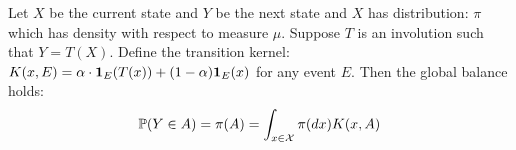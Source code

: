 \documentclass{article}
\begin{document}




\begin{theorem}\label{thm_invariance}
Let $X$ be the current state and $Y$ be the next state and $X$ has distribution: $\pi$ which has density with respect to measure $\mu$. Suppose $T$ is an involution such that $Y = T(X)$. Define the transition kernel: $K(x, E) = \alpha \cdot {\mathbf 1}_E(T(x)) + (1 - \alpha) {\mathbf 1}_E(x)$ for any event $E$. Then the global balance holds:
\[\mathbb{P}(Y \in A) = \pi(A) = \int_{x \in {\cal X}} \pi(dx) K(x, A)\]
\end{theorem}
\end{document}
